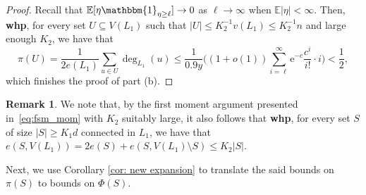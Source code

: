 \documentclass[reqno,final,a4paper]{amsart}
\theoremstyle{definition}
\newtheorem{remark}[thm]{Remark}
\def\e{\mathrm{e}}
\newcommand{\1}{\mathbbm{1}}
\begin{document}
\begin{proof}
Recall that $\mathbb{E}[\eta\1_{\eta\geq \ell}]\to 0$ as $\ell\to\infty$ when $\mathbb{E}|\eta|<\infty$.
Then, \textbf{whp}, for every set $U\subseteq V(L_1)$ such that $|U|\le K_2^{-1}v(L_1)\le K_2^{-1}n$ and large enough $K_2$, we have that 
\[\pi(U) = \frac{1}{2e(L_1)}\sum_{u\in U} \deg_{L_1}(u)\le \frac{1}{0.9y}\bigg((1+o(1))\sum_{i=\ell}^{\infty} \e^{-c} \frac{c^{i}}{i!} \cdot i\bigg) < \frac{1}{2},\]
which finishes the proof of part (b).
\end{proof}

\begin{remark}\label{rem:sparse}
We note that, by the first moment argument presented in~\eqref{eq:fsm_mom} with $K_2$ suitably large, it also follows that \textbf{whp}, for every set $S$ of size $|S|\ge K_1d$ connected in $L_1$, we have that $e(S,V(L_1))=2e(S)+e(S,V(L_1)\setminus S)\le K_2|S|$. 
\end{remark}

Next, we use Corollary \ref{cor: new expansion} to translate the said bounds on $\pi(S)$ to bounds on $\Phi(S)$.
\end{document}
